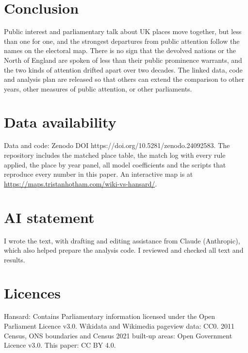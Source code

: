 \documentclass[11pt,a4paper]{article}
\begin{document}
\section{Conclusion}
Public interest and parliamentary talk about UK places move together, but less than one for one, and the strongest departures from public attention follow the names on the electoral map. There is no sign that the devolved nations or the North of England are spoken of less than their public prominence warrants, and the two kinds of attention drifted apart over two decades. The linked data, code and analysis plan are released so that others can extend the comparison to other years, other measures of public attention, or other parliaments.

\section*{Data availability}
Data and code: Zenodo DOI https://doi.org/10.5281/zenodo.24092583. The repository includes the matched place table, the match log with every rule applied, the place by year panel, all model coefficients and the scripts that reproduce every number in this paper. An interactive map is at \url{https://maps.tristanhotham.com/wiki-vs-hansard/}.

\section*{AI statement}
I wrote the text, with drafting and editing assistance from Claude (Anthropic), which also helped prepare the analysis code. I reviewed and checked all text and results.

\section*{Licences}
Hansard: Contains Parliamentary information licensed under the Open Parliament Licence v3.0. Wikidata and Wikimedia pageview data: CC0. 2011 Census, ONS boundaries and Census 2021 built-up areas: Open Government Licence v3.0. This paper: CC BY 4.0.
\end{document}
